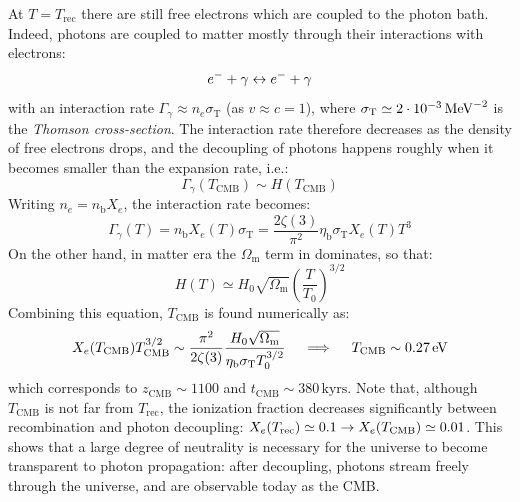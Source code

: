 At $ T = T_\text{rec} $ there are still free electrons which are coupled to the photon bath. Indeed, photons are coupled to matter mostly through their interactions with electrons:
\begin{equation*}
  e^- + \gamma \leftrightarrow e^- + \gamma
\end{equation*}
with an interaction rate $ \Gamma_\gamma \approx n_e \sigma_\text{T} $ (as $ v \approx c = 1 $), where $ \sigma_\text{T} \simeq 2 \cdot 10^{-3} \,\mathrm{MeV}^{-2} $ is the \emph{Thomson cross-section}. The interaction rate therefore decreases as the density of free electrons drops, and the decoupling of photons happens roughly when it becomes smaller than the expansion rate, i.e.:
\begin{equation}
  \Gamma_\gamma(T_\text{CMB}) \sim H(T_\text{CMB})
\end{equation}
Writing $ n_e = n_\text{b} X_e $, the interaction rate becomes:
\begin{equation*}
  \Gamma_\gamma(T) = n_\text{b} X_e(T) \sigma_\text{T} = \frac{2\zeta(3)}{\pi^2} \eta_\text{b} \sigma_\text{T} X_e(T) T^3
\end{equation*}
On the other hand, in matter era the $ \Omega_\text{m} $ term in  dominates, so that:
\begin{equation*}
  H(T) \simeq H_0 \sqrt{\Omega_\text{m}} \left( \frac{T}{T_0} \right)^{3/2}
\end{equation*}
Combining this equation, $ T_\text{CMB} $ is found numerically as:
\begin{equation}
  X_e(T_\text{CMB}) T_\text{CMB}^{3/2} \sim \frac{\pi^2}{2\zeta(3)} \frac{H_0 \sqrt{\Omega_\text{m}}}{\eta_\text{b} \sigma_\text{T} T_0^{3/2}}
  \quad \implies \quad
  T_\text{CMB} \sim 0.27 \,\mathrm{eV}
\end{equation}
which corresponds to $ z_\text{CMB} \sim 1100 $ and $ t_\text{CMB} \sim 380 \,\text{kyrs} $. Note that, although $ T_\text{CMB} $ is not far from $ T_\text{rec} $, the ionization fraction decreases significantly between recombination and photon decoupling: $ X_e(T_\text{rec}) \simeq 0.1 \rightarrow X_e(T_\text{CMB}) \simeq 0.01 $. This shows that a large degree of neutrality is necessary for the universe to become transparent to photon propagation: after decoupling, photons stream freely through the universe, and are observable today as the CMB.










